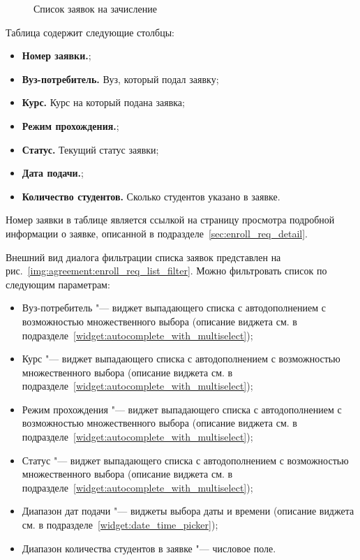 \begin{figure}[H]
	\caption{Список заявок на зачисление}
	\label{img:agreement:enroll_req_list}
\end{figure}

Таблица содержит следующие столбцы:
\begin{itemize}
	\item \textbf{Номер заявки.};
	\item \textbf{Вуз-потребитель.} Вуз, который подал заявку;
	\item \textbf{Курс.} Курс на который подана заявка;
	\item \textbf{Режим прохождения.};
	\item \textbf{Статус.} Текущий статус заявки;
	\item \textbf{Дата подачи.};
	\item \textbf{Количество студентов.} Сколько студентов указано в заявке.
\end{itemize}

 Номер заявки в таблице является ссылкой на страницу просмотра подробной информации о заявке, 
описанной в подразделе~\ref{sec:enroll_req_detail}.

Внешний вид диалога фильтрации списка заявок представлен на рис.~\ref{img:agreement:enroll_req_list_filter}.
Можно фильтровать список по следующим параметрам:
\begin{itemize}
	\item Вуз-потребитель "--- виджет выпадающего списка с автодополнением с возможностью множественного выбора 
	(описание виджета см. в подразделе~\ref{widget:autocomplete_with_multiselect});
	\item Курс "--- виджет выпадающего списка с автодополнением с возможностью множественного выбора 
	(описание виджета см. в подразделе~\ref{widget:autocomplete_with_multiselect});
	\item Режим прохождения "--- виджет выпадающего списка с автодополнением с возможностью множественного выбора 
	(описание виджета см. в подразделе~\ref{widget:autocomplete_with_multiselect});
	\item Статус "--- виджет выпадающего списка с автодополнением с возможностью множественного выбора 
	(описание виджета см. в подразделе~\ref{widget:autocomplete_with_multiselect});
	\item Диапазон дат подачи "--- виджеты выбора даты и времени 
	(описание виджета см. в подразделе~\ref{widget:date_time_picker});
	\item Диапазон количества студентов в заявке "--- числовое поле.
\end{itemize}

